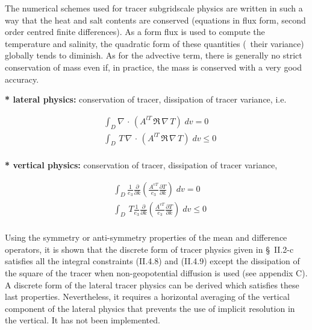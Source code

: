 \documentclass[../main/NEMO_manual]{subfiles}
\begin{document}
The numerical schemes used for tracer subgridscale physics are written in such a way that
the heat and salt contents are conserved (equations in flux form, second order centred finite differences).
As a form flux is used to compute the temperature and salinity,
the quadratic form of these quantities (\ie\ their variance) globally tends to diminish.
As for the advective term, there is generally no strict conservation of mass even if,
in practice, the mass is conserved with a very good accuracy.

\textbf{* lateral physics: }conservation of tracer, dissipation of tracer
variance, i.e.

\[
  \begin{aligned}
    &\int_D \nabla\, \cdot\, \left( A^{lT} \,\Re \,\nabla \,T \right)\;dv = 0 \\
    &\int_D \,T\, \nabla\, \cdot\, \left( A^{lT} \,\Re \,\nabla \,T \right)\;dv \leq 0 \\
  \end{aligned}
\]

\textbf{* vertical physics: }conservation of tracer, dissipation of tracer variance, \ie

\[
  \begin{aligned}
    & \int_D \frac{1}{e_3 } \frac{\partial }{\partial k}\left( \frac{A^{vT}}{e_3 }  \frac{\partial T}{\partial k}  \right)\;dv = 0 \\
    & \int_D \,T \frac{1}{e_3 } \frac{\partial }{\partial k}\left( \frac{A^{vT}}{e_3 }  \frac{\partial T}{\partial k}  \right)\;dv \leq 0 \\
  \end{aligned}
\]

Using the symmetry or anti-symmetry properties of the mean and difference operators,
it is shown that the discrete form of tracer physics given in {\S}~II.2-c satisfies all the integral constraints
(II.4.8) and (II.4.9) except the dissipation of the square of the tracer when non-geopotential diffusion is used
(see appendix C).
A discrete form of the lateral tracer physics can be derived which satisfies these last properties.
Nevertheless, it requires a horizontal averaging of the vertical component of the lateral physics that
prevents the use of implicit resolution in the vertical.
It has not been implemented.

\subinc{}
\end{document}
